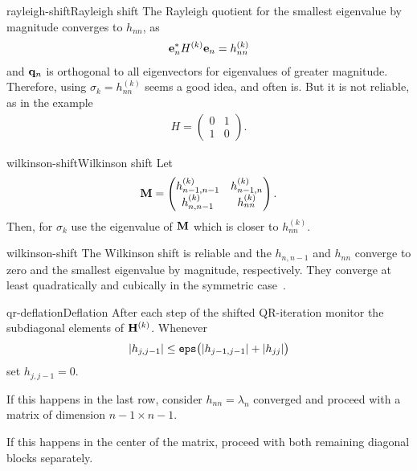 \begin{Example*}{rayleigh-shift}{Rayleigh shift}
  The Rayleigh quotient for the smallest eigenvalue by magnitude
  converges to $h_{nn}$, as
  \begin{gather}
    \mathbf e_n^* H^{(k)} \mathbf e_n = h_{nn}^{(k)}
  \end{gather}
  and $\mathbf q_n$ is orthogonal to all eigenvectors for eigenvalues of
  greater magnitude. Therefore, using $\sigma_k = h_{nn}^{(k)}$ seems
  a good idea, and often is. But it is not reliable, as in the example
  \begin{gather}
    H =
    \begin{pmatrix}
      0 & 1 \\ 1 & 0
    \end{pmatrix}.
  \end{gather}
\end{Example*}

\begin{Definition*}{wilkinson-shift}{Wilkinson shift}
  Let
  \begin{gather}
    \mathbf M =
    \begin{pmatrix}
      h_{n-1,n-1}^{(k)}&h_{n-1,n}^{(k)}\\h_{n,n-1}^{(k)}&h_{nn}^{(k)}
    \end{pmatrix}.
  \end{gather}
  Then, for $\sigma_k$ use the eigenvalue of $\mathbf M$ which is closer
  to $h_{nn}^{(k)}$.
\end{Definition*}

\begin{Remark}{wilkinson-shift}
  The Wilkinson shift is reliable and the $h_{n,n-1}$ and $h_{nn}$
  converge to zero and the smallest eigenvalue by magnitude,
  respectively. They converge at least quadratically and cubically in
  the symmetric case~\cite[Section 8.2]{GolubVanLoan83}.
\end{Remark}

\begin{Algorithm*}{qr-deflation}{Deflation}
  After each step of the shifted QR-iteration monitor the subdiagonal
  elements of $\mathbf H^{(k)}$. Whenever
  \begin{gather}
    \lvert h_{j,j-1}\rvert \le \texttt{eps} \bigl(\lvert h_{j-1,j-1}\rvert+\lvert h_{jj}\rvert\bigr)
  \end{gather}
  set $h_{j,j-1}=0$.

  If this happens in the last row, consider $h_{nn}=\lambda_n$
  converged and proceed with a matrix of dimension $n-1\times n-1$.

  If this happens in the center of the matrix, proceed with both
  remaining diagonal blocks separately.
\end{Algorithm*}


